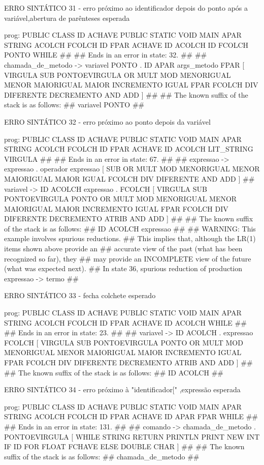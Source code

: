 \documentclass[12pt,a4paper,twoside]{report}
\begin{document}
\begin{terminal}
ERRO SINTÁTICO 31 -  erro próximo ao identificador depois do ponto após a variável,abertura de  parênteses esperada

prog: PUBLIC CLASS ID ACHAVE PUBLIC STATIC VOID MAIN APAR STRING ACOLCH FCOLCH ID FPAR ACHAVE ID ACOLCH ID FCOLCH PONTO WHILE 
##
## Ends in an error in state: 32.
##
## chamada_de_metodo -> variavel PONTO . ID APAR args_metodo FPAR [ VIRGULA SUB PONTOEVIRGULA OR MULT MOD MENORIGUAL MENOR MAIORIGUAL MAIOR INCREMENTO IGUAL FPAR FCOLCH DIV DIFERENTE DECREMENTO AND ADD ]
##
## The known suffix of the stack is as follows:
## variavel PONTO 
##

ERRO SINTÁTICO 32 -  erro próximo ao ponto depois da variável

prog: PUBLIC CLASS ID ACHAVE PUBLIC STATIC VOID MAIN APAR STRING ACOLCH FCOLCH ID FPAR ACHAVE ID ACOLCH LIT_STRING VIRGULA 
##
## Ends in an error in state: 67.
##
## expressao -> expressao . operador expressao [ SUB OR MULT MOD MENORIGUAL MENOR MAIORIGUAL MAIOR IGUAL FCOLCH DIV DIFERENTE AND ADD ]
## variavel -> ID ACOLCH expressao . FCOLCH [ VIRGULA SUB PONTOEVIRGULA PONTO OR MULT MOD MENORIGUAL MENOR MAIORIGUAL MAIOR INCREMENTO IGUAL FPAR FCOLCH DIV DIFERENTE DECREMENTO ATRIB AND ADD ]
##
## The known suffix of the stack is as follows:
## ID ACOLCH expressao 
##
## WARNING: This example involves spurious reductions.
## This implies that, although the LR(1) items shown above provide an
## accurate view of the past (what has been recognized so far), they
## may provide an INCOMPLETE view of the future (what was expected next).
## In state 36, spurious reduction of production expressao -> termo 
##

ERRO SINTÁTICO 33 -  fecha colchete esperado

prog: PUBLIC CLASS ID ACHAVE PUBLIC STATIC VOID MAIN APAR STRING ACOLCH FCOLCH ID FPAR ACHAVE ID ACOLCH WHILE 
##
## Ends in an error in state: 23.
##
## variavel -> ID ACOLCH . expressao FCOLCH [ VIRGULA SUB PONTOEVIRGULA PONTO OR MULT MOD MENORIGUAL MENOR MAIORIGUAL MAIOR INCREMENTO IGUAL FPAR FCOLCH DIV DIFERENTE DECREMENTO ATRIB AND ADD ]
##
## The known suffix of the stack is as follows:
## ID ACOLCH 
##

ERRO SINTÁTICO 34 -  erro próximo à "identificador[" ,expressão esperada

prog: PUBLIC CLASS ID ACHAVE PUBLIC STATIC VOID MAIN APAR STRING ACOLCH FCOLCH ID FPAR ACHAVE ID APAR FPAR WHILE 
##
## Ends in an error in state: 131.
##
## comando -> chamada_de_metodo . PONTOEVIRGULA [ WHILE STRING RETURN PRINTLN PRINT NEW INT IF ID FOR FLOAT FCHAVE ELSE DOUBLE CHAR ]
##
## The known suffix of the stack is as follows:
## chamada_de_metodo 
##


\end{terminal}
\end{document}
